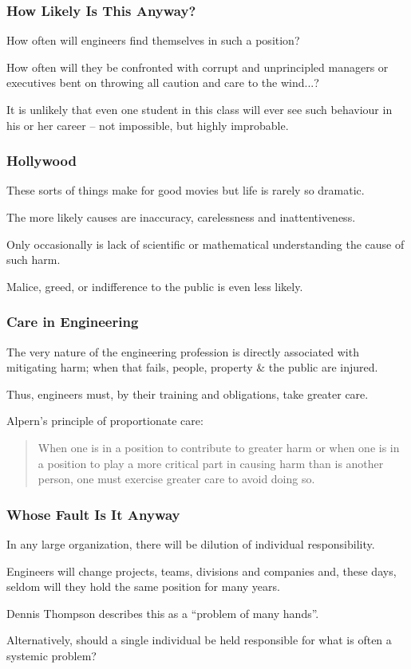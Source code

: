 \begin{frame}
\frametitle{How Likely Is This Anyway?}

How often will engineers find themselves in such a position?

How often will they be confronted with corrupt and unprincipled managers or executives bent on throwing all caution and care to the wind...?


It is unlikely that even one student in this class will ever see such behaviour in his or her career -- not impossible, but highly improbable.

\end{frame}



\begin{frame}
\frametitle{Hollywood}

These sorts of things make for good movies but life is rarely so dramatic.

The more likely causes are inaccuracy, carelessness and inattentiveness.

Only occasionally is lack of scientific or mathematical understanding the cause of such harm. 

Malice, greed, or indifference to the public is even less likely.


\end{frame}



\begin{frame}
\frametitle{Care in Engineering}

The very nature of the engineering profession is directly associated with mitigating harm; when that fails, people, property \& the public are injured. 

Thus, engineers must, by their training and obligations, take greater care.

Alpern's principle of proportionate care:
\begin{quote}
When one is in a  position to contribute to greater harm or when one is in a position to play a more critical part in causing harm than is another person, one must exercise greater care to avoid doing so.
\end{quote}

\end{frame}




\begin{frame}
\frametitle{Whose Fault Is It Anyway}

In any large organization, there will be dilution of individual responsibility.

Engineers will change projects, teams, divisions and companies and, these days, seldom will they hold the same position for many years.


Dennis Thompson describes this as a ``problem of many hands''.


Alternatively, should a single individual be held responsible for what is often a systemic problem?



\end{frame}

